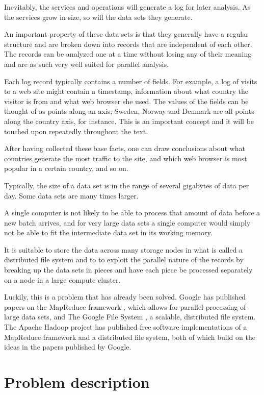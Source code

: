 \documentclass[a4paper,10pt]{book}
\begin{document}
Inevitably, the services and operations will generate a log for later
analysis. As the services grow in size, so will the data sets they generate.

An important property of these data sets is that they generally have a regular
structure and are broken down into records that are independent of each other.
The records can be analyzed one at a time without losing any of their meaning
and are as such very well suited for parallel analysis.

Each log record typically contains a number of fields. For example, a log of
visits to a web site might contain a timestamp, information about what country
the visitor is from and what web browser she used. The values of the fields
can be thought of as points along an axis; Sweden, Norway and Denmark are all
points along the country axis, for instance. This is an important concept and
it will be touched upon repeatedly throughout the text.

After having collected these base facts, one can draw conclusions about what
countries generate the most traffic to the site, and which web browser is most
popular in a certain country, and so on.

Typically, the size of a data set is in the range of several gigabytes of data
per day. Some data sets are many times larger.

A single computer is not likely to be able to process that amount of data
before a new batch arrives, and for very large data sets a single computer
would simply not be able to fit the intermediate data set in its working
memory.

It is suitable to store the data across many storage nodes in what is called a
distributed file system and to to exploit the parallel nature of the records
by breaking up the data sets in pieces and have each piece be processed
separately on a node in a large compute cluster.

Luckily, this is a problem that has already been solved. Google has published
papers on the MapReduce framework \cite{mapreduce}, which allows for parallel
processing of large data sets, and The Google File System \cite{gfs}, a
scalable, distributed file system. The Apache Hadoop \cite{hadoop} project has
published free software implementations of a MapReduce framework and a
distributed file system, both of which build on the ideas in the papers
published by Google.


\section{Problem description}
\end{document}

